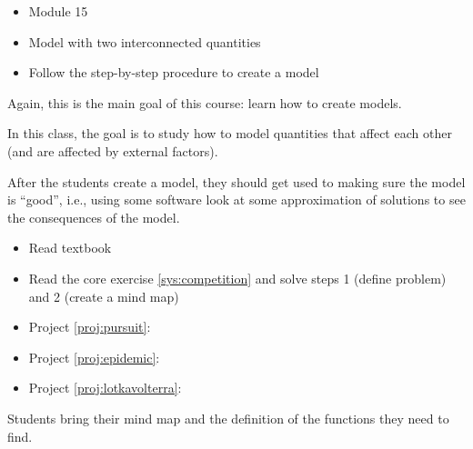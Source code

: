 \begin{lesson}

	\begin{itemize}
		\item Module 15
	\end{itemize}

	\begin{itemize}
		\item Model with two interconnected quantities
		\item Follow the step-by-step procedure to create a model
	\end{itemize}
	

Again, this is the main goal of this course: learn how to create models.

In this class, the goal is to study how to model quantities that affect each other (and are affected by external factors). 

After the students create a model, they should get used to making sure the model is ``good'', i.e., using some software look at some approximation of solutions to see the consequences of the model.



\begin{itemize}
	\item Read textbook
	\item Read the core exercise \ref{sys:competition} and solve steps 1 (define problem) and 2 (create a mind map)
\end{itemize}



\begin{itemize}
	\item Project \ref{proj:pursuit}: \pursuittitle
	\item Project \ref{proj:epidemic}: \epidemictitle
	\item Project \ref{proj:lotkavolterra}: \lotkavolterratitle
\end{itemize}



\end{lesson}



\begin{annotation}
\begin{goals}
	Students bring their mind map and the definition of the functions they need to find.
\end{goals}	
\end{annotation}

